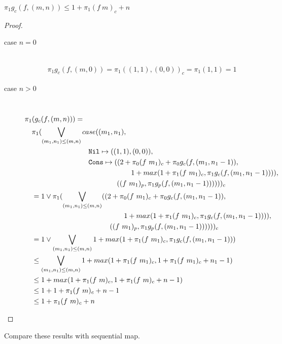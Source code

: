 %
\begin{theorem}
  $\pi_1 g_c(f, (m, n)) \leq 1 + \pi_1 (f\ m)_c + n$
\end{theorem}
%
\begin{proof}
  \begin{description}
    \item[case $n=0$]\mbox{}\\[-1.5\baselineskip]
      \begin{align*}
      \pi_1 g_c(f, (m, 0)) = \pi_1((1, 1), (0, 0))_c = \pi_1(1, 1) = 1
      \end{align*}
    \item[case $n>0$]\mbox{}\\[-1.5\baselineskip]
      \[\begin{split}
        &\pi_1(g_c(f, (m, n))) = \\
        &\quad \pi_1(\bigvee\limits_{(m_1, n_1) \leq (m, n)} case((m_1, n_1), \\
        &\quadfive\quadfour \T{Nil} \mapsto ((1, 1), (0, 0)), \\
        &\quadfive\quadfour \T{Cons} \mapsto ((2 + \pi_0(f\ m_1)_c + \pi_0g_c(f, (m_1, n_1-1)), \\
        &\quadfive\quadten                     1 + max(1 + \pi_1(f\ m_1)_c, \pi_1g_c(f, (m_1, n_1-1)))), \\
        &\quadfive\quadeight                  ((f\ m_1)_p, \pi_1 g_p(f, (m_1, n_1-1))))) )_c \\
        &\quad = 1 \vee \pi_1(\bigvee\limits_{(m_1, n_1) \leq (m, n)} ((2 + \pi_0(f\ m_1)_c + \pi_0g_c(f, (m_1, n_1-1)), \\
        &\quadfour\quadten                     1 + max(1 + \pi_1(f\ m_1)_c, \pi_1g_c(f, (m_1, n_1-1)))), \\
        &\quadfour\quadeight                  ((f\ m_1)_p, \pi_1 g_p(f, (m_1, n_1-1))))) )_c \\
        &\quad = 1 \vee \bigvee\limits_{(m_1, n_1) \leq (m, n)} 1 + max(1 + \pi_1 (f\ m_1)_c, \pi_1 g_c(f, (m_1, n_1-1))) \\
        &\quad \leq \bigvee\limits_{(m_1, n_1) \leq (m, n)} 1 + max(1 + \pi_1 (f\ m_1)_c, 1 + \pi_1 (f\ m_1)_c + n_1 - 1) \\
        &\quad \leq 1 + max(1 + \pi_1 (f\ m)_c, 1 + \pi_1 (f\ m)_c + n - 1) \\
        &\quad \leq 1 + 1 + \pi_1 (f\ m)_c + n - 1 \\
        &\quad \leq 1 + \pi_1 (f\ m)_c + n
      \end{split}\]
  \end{description}
\end{proof}
%
Compare these results with sequential map.


